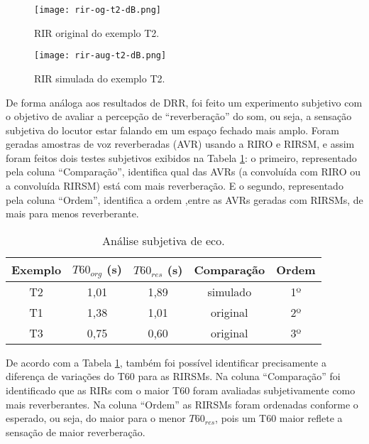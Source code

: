 \begin{figure} [H]
    \centering
    \texttt{[image: rir-og-t2-dB.png]}
    \caption{RIR original do exemplo T2.}
    \label{fig:rir-og-t2}
\end{figure} 

\begin{figure} [H]
    \centering
    \texttt{[image: rir-aug-t2-dB.png]}
    \caption{RIR simulada do exemplo T2.}
    \label{fig:rir-aug-t2}
\end{figure} 

De forma análoga aos resultados de DRR, foi feito um experimento subjetivo com o objetivo de avaliar a percepção de “reverberação” do som, ou seja,
a sensação subjetiva do locutor estar falando em um espaço fechado mais amplo.
Foram geradas amostras de voz reverberadas (AVR) usando a RIRO e RIRSM, e assim foram feitos dois testes subjetivos exibidos na Tabela \ref{tbl:t60-exp}:
o primeiro, representado pela coluna “Comparação”, identifica qual das AVRs (a convoluída com RIRO ou a convoluída RIRSM) está com mais reverberação.
E o segundo, representado pela coluna “Ordem”, identifica a ordem ,entre as AVRs geradas com RIRSMs, de mais para menos reverberante.

\begin{table} [H]
    \centering
    \caption{Análise subjetiva de eco.}
    \label{tbl:t60-exp}
    \begin{tabular}{c|c|c|c|c}

        \textbf{Exemplo} & 
        \textbf{$T60_{org}$ (s)} & 
        \textbf{$T60_{res}$ (s)} & 
        \textbf{Comparação} &
        \textbf{Ordem} \\
        \hline 

        T2 & 1,01 & 1,89 & simulado & 1º \\
        T1 & 1,38 & 1,01 & original & 2º \\
        T3 & 0,75 & 0,60 & original & 3º \\

    \end{tabular}
\end{table}

De acordo com a Tabela \ref{tbl:t60-exp}, também foi possível identificar precisamente a diferença de variações do T60 para as RIRSMs.
Na coluna ``Comparação'' foi identificado que as RIRs com o maior T60 foram avaliadas subjetivamente como mais reverberantes.
Na coluna ``Ordem'' as RIRSMs foram ordenadas conforme o esperado, ou seja, do maior para o menor $T60_{res}$, pois um T60 maior reflete a sensação
de maior reverberação.

